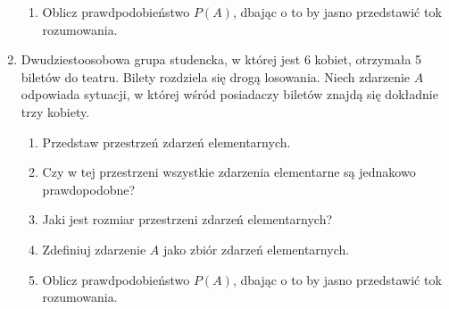\documentclass{mwart}
\newcommand{\ans}[1]{}
\begin{document}
\begin{enumerate}
\begin{enumerate}
\item Oblicz prawdpodobieństwo $P(A)$, dbając o to by jasno przedstawić tok rozumowania. \ans{$P(A)=\frac{604800}{10^7}=0{,}06$}%
\end{enumerate}%
\item Dwudziestoosobowa grupa studencka, w której jest 6 kobiet, otrzymała 5 biletów do teatru. Bilety rozdziela się drogą losowania. Niech zdarzenie $A$ odpowiada sytuacji, w której wśród posiadaczy biletów znajdą się dokładnie trzy kobiety.
\begin{enumerate}%
\item Przedstaw przestrzeń zdarzeń elementarnych. \ans{$\Omega=\{\omega_J|\left|J\right|=5 \land J\subset\{1,2,\ldots,20\}\}$}%
\item Czy w tej przestrzeni wszystkie zdarzenia elementarne są jednakowo prawdopodobne? \ans{Tak}%
\item Jaki jest rozmiar przestrzeni zdarzeń elementarnych? \ans{$\left|\Omega\right|={20\choose 5}=15504$}%
\item Zdefiniuj zdarzenie $A$ jako zbiór zdarzeń elementarnych. \ans{$A=\{\omega_J|\left|J\cap \{1,2,\ldots,6\}\right|=3\}, \left|A\right|={6\choose 3}{14\choose 2}=1820$}%
\item Oblicz prawdpodobieństwo $P(A)$, dbając o to by jasno przedstawić tok rozumowania. \ans{$P(A)=0{,}12$}%
\end{enumerate}%
\end{enumerate}%
\clearpage
\end{document}
